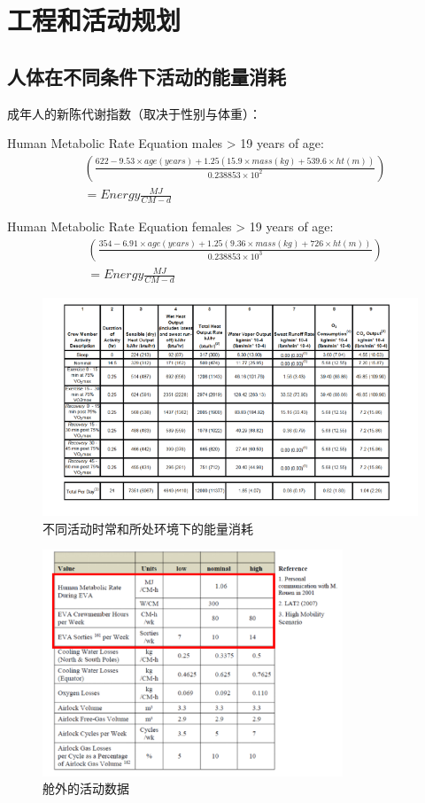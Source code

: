 \chapter{工程和活动规划}
\label{chp:activity:begin}

\section{人体在不同条件下活动的能量消耗}
成年人的新陈代谢指数（取决于性别与体重）：

Human Metabolic Rate Equation males > 19 years of age:
\begin{align*}
  & \left( \frac{622 - 9.53 \times age(years) + 1.25 \left(15.9 \times mass(kg) + 539.6 \times ht(m)\right)}{0.238853 \times 10^2} \right) \\
  &= Energy \frac{MJ}{CM-d}
\end{align*}

Human Metabolic Rate Equation females > 19 years of age:
\begin{align*}
  & \left( \frac{354-6.91 \times age(years) + 1.25 \left( 9.36 \times mass(kg) + 726 \times ht(m) \right)}{0.238853 \times 10^3} \right) \\
  &= Energy \frac{MJ}{CM-d}
\end{align*}

\begin{figure}[H]
  \centering
  \includegraphics[width=\textwidth]{figure/metabolic.png}
  \caption{不同活动时常和所处环境下的能量消耗}
\end{figure}

\begin{figure}[H]
  \centering
  \includegraphics[width=0.8\textwidth]{figure/outdoor.png}
  \caption{舱外的活动数据}
\end{figure}

